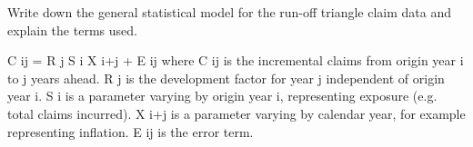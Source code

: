 \documentclass[a4paper,12pt]{article}
\begin{document}
Write down the general statistical model for the run-off triangle claim data and
explain the terms used. 

C ij = R j S i X i+j + E ij
where
C ij is the incremental claims from origin year i to j years ahead.
R j is the development factor for year j independent of origin year i.
S i is a parameter varying by origin year i, representing exposure (e.g. total
claims incurred).
X i+j is a parameter varying by calendar year, for example representing
inflation.
E ij is the error term.
\end{document}

